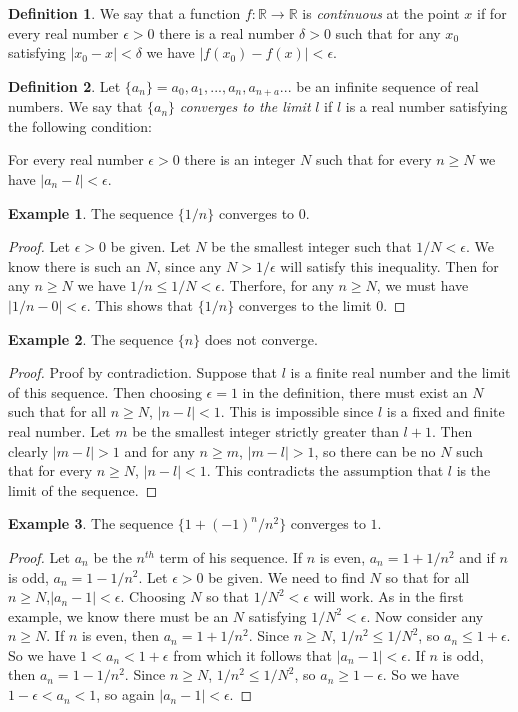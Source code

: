 \documentclass[11pt,a4paper]{report}
\theoremstyle{plain}
\theoremstyle{definition}
\newtheorem{defn}{Definition}[section]
\newtheorem{exmp}{Example}[section]
\theoremstyle{remark}
\begin{document}
\begin{defn}
We say that a function $f\colon\mathbb{R}\to\mathbb{R}$ is \textit{continuous} at the point $x$ if for every real number $\epsilon>0$ there is a real number $\delta>0$ such that for any $x_0$ satisfying $|x_0-x|<\delta$ we have $|f(x_0) - f(x)| < \epsilon$.
\end{defn}
\begin{defn}
Let $\{a_n\} = a_0, a_1, ..., a_n, a_{n+a}...$ be an infinite sequence of real numbers.  We say that $\{a_n\}$ \textit{converges to the limit} $l$ if $l$ is a real number satisfying the following condition:
\begin{adjustwidth}{.5cm}{}
For every real number $\epsilon>0$ there is an integer $N$ such that for every $n \geq N$ we have $|a_n - l| < \epsilon$.
\end{adjustwidth}
\end{defn}
\begin{exmp}
The sequence $\{1/n\}$ converges to 0.
\begin{proof}
Let $\epsilon>0$ be given. Let $N$ be the smallest integer such that $1/N < \epsilon$.  We know there is such an $N$, since any $N > 1/ \epsilon$ will satisfy this inequality. Then for any $n \geq N$ we have $1/n \leq 1/N < \epsilon$.  Therfore, for any $n \geq N$, we must have $|1/n - 0| < \epsilon$.  This shows that $\{1/n\}$ converges to the limit $0$.
\end{proof}
\end{exmp}
\begin{exmp}
The sequence $\{n\}$ does not converge.
\begin{proof}
Proof by contradiction.  Suppose that $l$ is a finite real number and the limit of this sequence. Then choosing $\epsilon = 1$ in the definition, there must exist an $N$ such that for all $n \geq N$, $|n - l| < 1$. This is impossible since $l$ is a fixed and finite real number.  Let $m$ be the smallest integer strictly greater than $l + 1$.  Then clearly $|m - l| > 1$ and for any $n \geq m$, $|m - l| > 1$, so there can be no $N$ such that for every $n \geq N$, $|n - l| < 1$. This contradicts the assumption that $l$ is the limit of the sequence.
\end{proof}
\end{exmp}
\begin{exmp}
The sequence $\{1 + (-1)^n/n^2\}$ converges to $1$.
\begin{proof}
Let $a_n$ be the $n^{th}$ term of his sequence.  If $n$ is even, $a_n = 1 + 1/n^2$ and if $n$ is odd, $a_n = 1 - 1/n^2$.  Let $\epsilon > 0$ be given.  We need to find $N$ so that for all $n \geq N$,$|a_n - 1| < \epsilon$.  Choosing $N$ so that $1/N^2 < \epsilon$ will work.  As in the first example, we know there must be an $N$ satisfying $1/N^2 < \epsilon$.  Now consider any $n \geq N$.  If $n$ is even, then $a_n = 1 + 1/n^2$.  Since $n \geq N$, $1/n^2 \leq 1/N^2$, so $a_n \leq 1 + \epsilon$.  So we have $1 < a_n < 1 + \epsilon$ from which it follows that $|a_n - 1| < \epsilon$.  If $n$ is odd, then $a_n = 1 - 1/n^2$. Since $n \geq N$, $1/n^2 \leq 1/N^2$, so $a_n \geq 1 - \epsilon$.  So we have $1 - \epsilon < a_n < 1$, so again $|a_n - 1| < \epsilon$.
\end{proof}
\end{exmp}
\end{document}
